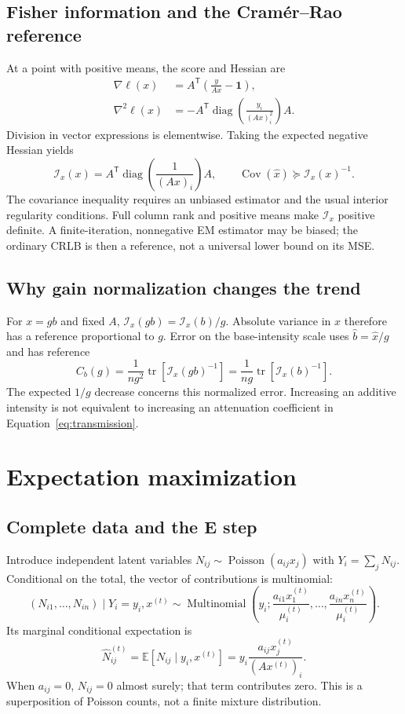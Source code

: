 \documentclass[11pt,a4paper]{article}
\newcommand{\E}{\mathbb E}
\newcommand{\Pois}{\operatorname{Poisson}}
\newcommand{\diag}{\operatorname{diag}}
\newcommand{\tr}{\operatorname{tr}}
\newcommand{\ones}{\mathbf 1}
\newcommand{\sectionpage}[2]{\clearpage\section{#1}\label{#2}}
\begin{document}
\subsection*{Fisher information and the Cram\'er--Rao reference}
At a point with positive means, the score and Hessian are
\begin{align}
 \nabla\ell(x)&=A^\mathsf T\!\left(\frac{y}{Ax}-\ones\right),\\
 \nabla^2\ell(x)&=-A^\mathsf T\diag\!\left(\frac{y_i}{(Ax)_i^2}\right)A.
\end{align}
Division in vector expressions is elementwise. Taking the expected negative Hessian yields
\begin{equation}
 \mathcal I_x(x)=A^\mathsf T\diag\!\left(\frac{1}{(Ax)_i}\right)A,
 \qquad \operatorname{Cov}(\widehat x)\succeq\mathcal I_x(x)^{-1}.
 \label{eq:fisher}
\end{equation}
The covariance inequality requires an unbiased estimator and the usual interior regularity conditions. Full column rank and positive means make $\mathcal I_x$ positive definite. A finite-iteration, nonnegative EM estimator may be biased; the ordinary CRLB is then a reference, not a universal lower bound on its MSE.

\subsection*{Why gain normalization changes the trend}
For $x=gb$ and fixed $A$, $\mathcal I_x(gb)=\mathcal I_x(b)/g$. Absolute variance in $x$ therefore has a reference proportional to $g$. Error on the base-intensity scale uses $\widehat b=\widehat x/g$ and has reference
\begin{equation}
 C_b(g)=\frac{1}{ng^2}\tr\!\left[\mathcal I_x(gb)^{-1}\right]
       =\frac{1}{ng}\tr\!\left[\mathcal I_x(b)^{-1}\right].
 \label{eq:gain}
\end{equation}
The expected $1/g$ decrease concerns this normalized error. Increasing an additive intensity is not equivalent to increasing an attenuation coefficient in Equation~\eqref{eq:transmission}.

\sectionpage{Expectation maximization}{sec:em}
\subsection*{Complete data and the E step}
Introduce independent latent variables $N_{ij}\sim\Pois(a_{ij}x_j)$ with $Y_i=\sum_jN_{ij}$. Conditional on the total, the vector of contributions is multinomial:
\begin{equation}
 (N_{i1},\ldots,N_{in})\mid Y_i=y_i,x^{(t)}
 \sim\operatorname{Multinomial}\!\left(y_i;\frac{a_{i1}x_1^{(t)}}{\mu_i^{(t)}},\ldots,
 \frac{a_{in}x_n^{(t)}}{\mu_i^{(t)}}\right).
\end{equation}
Its marginal conditional expectation is
\begin{equation}
 \widehat N_{ij}^{(t)}=\E[N_{ij}\mid y_i,x^{(t)}]
   =y_i\frac{a_{ij}x_j^{(t)}}{(Ax^{(t)})_i}.
\end{equation}
When $a_{ij}=0$, $N_{ij}=0$ almost surely; that term contributes zero. This is a superposition of Poisson counts, not a finite mixture distribution.
\end{document}
